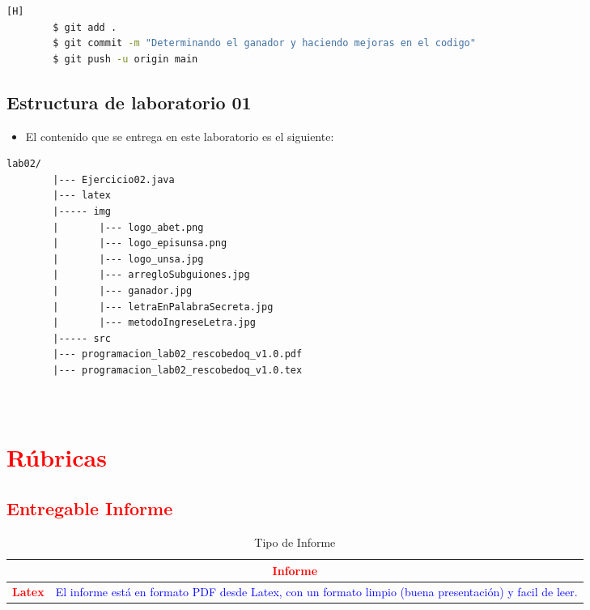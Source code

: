 \documentclass{article}
\begin{document}
	\begin{lstlisting}[language=bash,caption={Commit: Determinando el ganador y haciendo mejoras en el código }][H]
		$ git add .
		$ git commit -m "Determinando el ganador y haciendo mejoras en el codigo"			
		$ git push -u origin main
	\end{lstlisting}
	
	
	\subsection{Estructura de laboratorio 01}
	\begin{itemize}	
		\item El contenido que se entrega en este laboratorio es el siguiente:
	\end{itemize}
	
	\begin{lstlisting}[style=ascii-tree]
		lab02/
		|--- Ejercicio02.java
		|--- latex
		|----- img
		|   	|--- logo_abet.png
		|   	|--- logo_episunsa.png
		|   	|--- logo_unsa.jpg
		|   	|--- arregloSubguiones.jpg    
		|   	|--- ganador.jpg
		|		|--- letraEnPalabraSecreta.jpg
		|		|--- metodoIngreseLetra.jpg
		|----- src
		|--- programacion_lab02_rescobedoq_v1.0.pdf    
		|--- programacion_lab02_rescobedoq_v1.0.tex
		
		
	\end{lstlisting}    
	
	\section{\textcolor{red}{Rúbricas}}
	
	\subsection{\textcolor{red}{Entregable Informe}}
	\begin{table}[H]
		\caption{Tipo de Informe}
		\setlength{\tabcolsep}{0.5em} %
		{\renewcommand{\arraystretch}{1.5}%
			\begin{tabular}{|p{3cm}|p{12cm}|}
				\hline
				\multicolumn{2}{|c|}{\textbf{\textcolor{red}{Informe}}}  \\
				\hline 
				\textbf{\textcolor{red}{Latex}} & \textcolor{blue}{El informe está en formato PDF desde Latex,  con un formato limpio (buena presentación) y facil de leer.}   \\ 
				\hline 
				
				
			\end{tabular}
		}
	\end{table}
	
\end{document}
